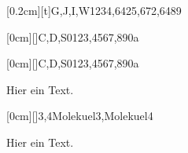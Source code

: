 \documentclass[./main.tex]{subfiles}
\begin{document}


\kastenarray[2.5cm]{3cm}[0.2cm][t]{G,J,I,W}{1234,6425,672,6489}

\kastenarray[3cm]{4cm}[0cm][]{C,D,S}{0123,4567,890a}

\kastenarray{2cm}[0cm][]{C,D,S}{0123,4567,890a}

Hier ein Text.


\kastenarray[7cm]{7cm}[0cm][]{3,4}{Molekuel3,Molekuel4}

Hier ein Text.

\clearpage
\aufgabenende
\end{document}
